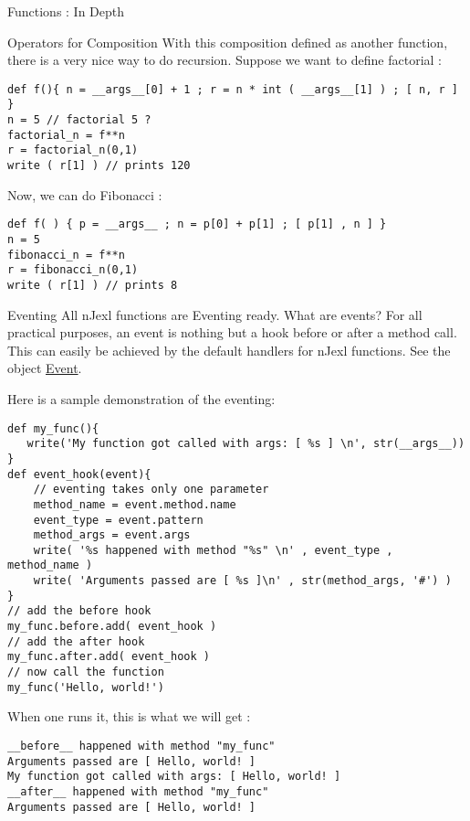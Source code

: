 \begin{section}{Functions : In Depth}
\begin{subsection}{Operators for Composition}
With this composition defined as another function, 
there is a very nice way to do recursion.
Suppose we want to define factorial :

\begin{lstlisting}[style=JexlStyle]
def f(){ n = __args__[0] + 1 ; r = n * int ( __args__[1] ) ; [ n, r ] }
n = 5 // factorial 5 ?
factorial_n = f**n 
r = factorial_n(0,1)
write ( r[1] ) // prints 120
\end{lstlisting}

Now, we can do Fibonacci :
\begin{lstlisting}[style=JexlStyle]
def f( ) { p = __args__ ; n = p[0] + p[1] ; [ p[1] , n ] }
n = 5 
fibonacci_n = f**n 
r = fibonacci_n(0,1)
write ( r[1] ) // prints 8 
\end{lstlisting}
\end{subsection}

\begin{subsection}{Eventing}
All nJexl functions are Eventing ready.
What are events? For all practical purposes, 
an event is nothing but a hook before or after a method call.
This can easily be achieved by the default handlers for nJexl functions.
See the object  
\href{https://github.com/nmondal/njexl/blob/master/lang/src/main/java/com/noga/njexl/lang/extension/oop/ScriptClassBehaviour.java}{Event}.

Here is a sample demonstration of the eventing:
\begin{lstlisting}[style=JexlStyle]
def my_func(){
   write('My function got called with args: [ %s ] \n', str(__args__))
}
def event_hook(event){  
    // eventing takes only one parameter  
    method_name = event.method.name 
    event_type = event.pattern
    method_args = event.args 
    write( '%s happened with method "%s" \n' , event_type , method_name )
    write( 'Arguments passed are [ %s ]\n' , str(method_args, '#') )
}
// add the before hook 
my_func.before.add( event_hook )
// add the after hook 
my_func.after.add( event_hook )
// now call the function 
my_func('Hello, world!')
\end{lstlisting}
When one runs it, this is what we will get :

\begin{lstlisting}[style=all]
__before__ happened with method "my_func" 
Arguments passed are [ Hello, world! ]
My function got called with args: [ Hello, world! ] 
__after__ happened with method "my_func" 
Arguments passed are [ Hello, world! ]
\end{lstlisting}

\end{subsection}


\end{section}

